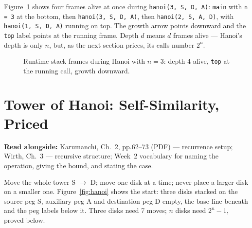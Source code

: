 \documentclass[11pt]{article}
\begin{document}
Figure~\ref{fig:frames} shows four frames alive at once during \texttt{hanoi(3, S, D, A)}: \texttt{main} with \texttt{n = 3} at the bottom, then \texttt{hanoi(3, S, D, A)}, then \texttt{hanoi(2, S, A, D)}, with \texttt{hanoi(1, S, D, A)} running on top. The growth arrow points downward and the \texttt{top} label points at the running frame. Depth $d$ means $d$ frames alive --- Hanoi's depth is only $n$, but, as the next section prices, its calls number $2^{n}$.

\begin{figure}[h]
  \centering
  \caption{Runtime-stack frames during Hanoi with $n = 3$: depth $4$ alive, \texttt{top} at the running call, growth downward.}
  \label{fig:frames}
\end{figure}

\section{Tower of Hanoi: Self-Similarity, Priced}

\textbf{Read alongside:} Karumanchi, Ch.~2, pp.62--73 (PDF) --- recurrence setup; Wirth, Ch.~3 --- recursive structure; Week~2 vocabulary for naming the operation, giving the bound, and stating the case.

Move the whole tower S $\to$ D; move one disk at a time; never place a larger disk on a smaller one. Figure~\ref{fig:hanoi} shows the start: three disks stacked on the source peg S, auxiliary peg A and destination peg D empty, the base line beneath and the peg labels below it. Three disks need 7 moves; $n$ disks need $2^{n} - 1$, proved below.
\end{document}

